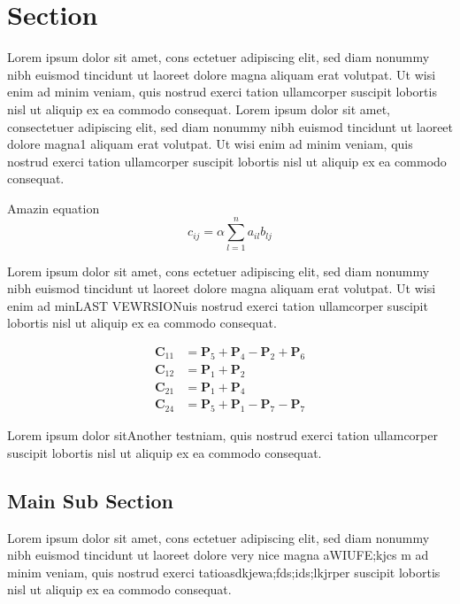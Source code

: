 \section{Section}

Lorem ipsum dolor sit amet, cons ectetuer adipiscing elit, sed diam nonummy nibh euismod tincidunt ut laoreet dolore magna aliquam erat volutpat. Ut wisi enim ad minim veniam, quis nostrud exerci tation ullamcorper suscipit lobortis nisl ut aliquip ex ea commodo consequat.
Lorem ipsum dolor sit amet, consectetuer adipiscing elit, sed diam nonummy nibh euismod tincidunt ut laoreet dolore magna1 aliquam erat volutpat. Ut wisi enim ad minim veniam, quis nostrud exerci tation ullamcorper suscipit lobortis nisl ut aliquip ex ea commodo consequat. 

Amazin equation
\begin{equation}
    c_{ij} = \alpha\sum_{l=1}^n a_{il}b_{lj}
    \label{eq: naive matrix mult}
\end{equation}


Lorem ipsum dolor sit amet, cons ectetuer adipiscing elit, sed diam nonummy nibh euismod tincidunt ut laoreet dolore magna aliquam erat volutpat. Ut wisi enim ad minLAST VEWRSIONuis nostrud exerci tation ullamcorper suscipit lobortis nisl ut aliquip ex ea commodo consequat.

\begin{align*}
    \textbf{C}_{11} &= \textbf{P}_5 + \textbf{P}_4-\textbf{P}_2+\textbf{P}_6\\
    \textbf{C}_{12} &= \textbf{P}_1 + \textbf{P}_2 \\
    \textbf{C}_{21} &= \textbf{P}_1 + \textbf{P}_4 \\
    \textbf{C}_{24} &= \textbf{P}_5 + \textbf{P}_1 - \textbf{P}_7 - \textbf{P}_7
\end{align*}

Lorem ipsum dolor sitAnother testniam, quis nostrud exerci tation ullamcorper suscipit lobortis nisl ut aliquip ex ea commodo consequat. 

\subsection{Main Sub Section}

Lorem ipsum dolor sit amet, cons ectetuer adipiscing elit, sed diam nonummy nibh euismod tincidunt ut laoreet dolore very nice magna aWIUFE;kjcs m ad minim veniam, quis nostrud exerci tatioasdkjewa;fds;ids;lkjrper suscipit lobortis nisl ut aliquip ex ea commodo consequat.

